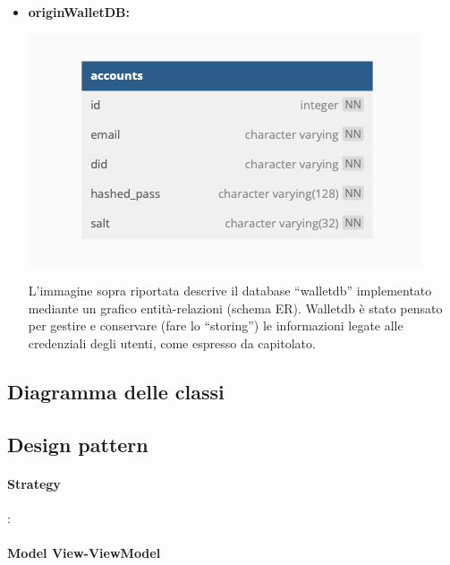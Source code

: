 \begin{itemize}
    \item \textbf{originWalletDB:}
     \begin{center}
        \includegraphics[scale = 0.6]{./res/img/walletdb.png}
      \end{center}
    
    L’immagine sopra riportata descrive il database “walletdb” implementato mediante un grafico entità-relazioni (schema ER).
    Walletdb è stato pensato per gestire e conservare (fare lo “storing”) le informazioni legate alle credenziali degli utenti, come espresso da capitolato.\\
    
\end{itemize} 


\subsection{Diagramma delle classi}

\subsection{Design pattern}
\paragraph{Strategy}:
\paragraph{Model View-ViewModel}

